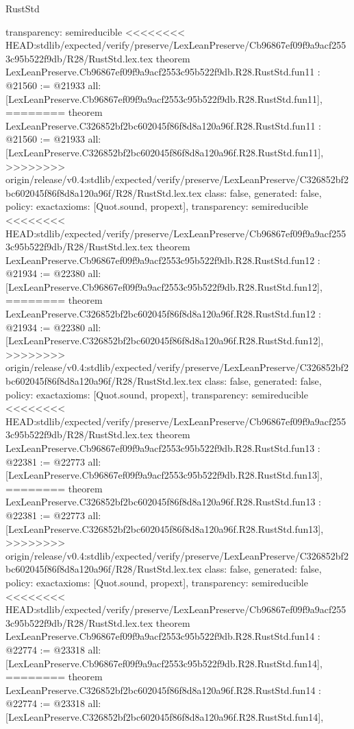 \begin{lexlean}{RustStd}
\begin{coremodule}
{\begin{coremodule}
{{{{{{{{{{{{{{  transparency: semireducible
}
<<<<<<<< HEAD:stdlib/expected/verify/preserve/LexLeanPreserve/Cb96867ef09f9a9acf2553c95b522f9db/R28/RustStd.lex.tex
theorem LexLeanPreserve.Cb96867ef09f9a9acf2553c95b522f9db.R28.RustStd.fun11 : @21560 := @21933 {
  all: [LexLeanPreserve.Cb96867ef09f9a9acf2553c95b522f9db.R28.RustStd.fun11],
========
theorem LexLeanPreserve.C326852bf2bc602045f86f8d8a120a96f.R28.RustStd.fun11 : @21560 := @21933 {
  all: [LexLeanPreserve.C326852bf2bc602045f86f8d8a120a96f.R28.RustStd.fun11],
>>>>>>>> origin/release/v0.4:stdlib/expected/verify/preserve/LexLeanPreserve/C326852bf2bc602045f86f8d8a120a96f/R28/RustStd.lex.tex
  class: false,
  generated: false,
  policy: exact{axioms: [Quot.sound, propext]},
  transparency: semireducible
}
<<<<<<<< HEAD:stdlib/expected/verify/preserve/LexLeanPreserve/Cb96867ef09f9a9acf2553c95b522f9db/R28/RustStd.lex.tex
theorem LexLeanPreserve.Cb96867ef09f9a9acf2553c95b522f9db.R28.RustStd.fun12 : @21934 := @22380 {
  all: [LexLeanPreserve.Cb96867ef09f9a9acf2553c95b522f9db.R28.RustStd.fun12],
========
theorem LexLeanPreserve.C326852bf2bc602045f86f8d8a120a96f.R28.RustStd.fun12 : @21934 := @22380 {
  all: [LexLeanPreserve.C326852bf2bc602045f86f8d8a120a96f.R28.RustStd.fun12],
>>>>>>>> origin/release/v0.4:stdlib/expected/verify/preserve/LexLeanPreserve/C326852bf2bc602045f86f8d8a120a96f/R28/RustStd.lex.tex
  class: false,
  generated: false,
  policy: exact{axioms: [Quot.sound, propext]},
  transparency: semireducible
}
<<<<<<<< HEAD:stdlib/expected/verify/preserve/LexLeanPreserve/Cb96867ef09f9a9acf2553c95b522f9db/R28/RustStd.lex.tex
theorem LexLeanPreserve.Cb96867ef09f9a9acf2553c95b522f9db.R28.RustStd.fun13 : @22381 := @22773 {
  all: [LexLeanPreserve.Cb96867ef09f9a9acf2553c95b522f9db.R28.RustStd.fun13],
========
theorem LexLeanPreserve.C326852bf2bc602045f86f8d8a120a96f.R28.RustStd.fun13 : @22381 := @22773 {
  all: [LexLeanPreserve.C326852bf2bc602045f86f8d8a120a96f.R28.RustStd.fun13],
>>>>>>>> origin/release/v0.4:stdlib/expected/verify/preserve/LexLeanPreserve/C326852bf2bc602045f86f8d8a120a96f/R28/RustStd.lex.tex
  class: false,
  generated: false,
  policy: exact{axioms: [Quot.sound, propext]},
  transparency: semireducible
}
<<<<<<<< HEAD:stdlib/expected/verify/preserve/LexLeanPreserve/Cb96867ef09f9a9acf2553c95b522f9db/R28/RustStd.lex.tex
theorem LexLeanPreserve.Cb96867ef09f9a9acf2553c95b522f9db.R28.RustStd.fun14 : @22774 := @23318 {
  all: [LexLeanPreserve.Cb96867ef09f9a9acf2553c95b522f9db.R28.RustStd.fun14],
========
theorem LexLeanPreserve.C326852bf2bc602045f86f8d8a120a96f.R28.RustStd.fun14 : @22774 := @23318 {
  all: [LexLeanPreserve.C326852bf2bc602045f86f8d8a120a96f.R28.RustStd.fun14],
}}}}}}}}}}}}}}}}}}
\end{coremodule}}
\end{coremodule}
\end{lexlean}
